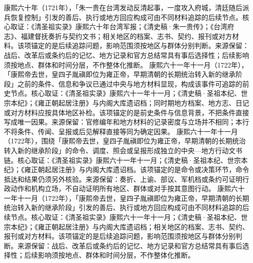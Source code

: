 康熙六十年（1721年），「朱一贵在台湾发动反清起事，一度攻入府城，清廷随后派兵恢复控制」引发的善后、执行或地方回应构成可由不同材料追踪的后续节点。核心取证：《清圣祖实录》康熙六十年台湾军报；《清史稿·朱一贵传》；《台湾府志》、福建督抚奏折与契约文书；相关地区的档案、志书、契约、报刊或对方材料。该项锚定的是后续追踪问题，影响范围须按地区与群体分别判断。来源保留：战后、改革后或条约后的记忆、地方记录和官方总结常具有事后选择性；后续影响须按地点、群体和时间分层，不作整体化推断。
康熙六十一年十一月（1722年），「康熙帝去世，皇四子胤禛即位为雍正帝，早期清朝的长期统治转入新的继承阶段」之前的条件、信息和争议已通过中央与地方材料显现，构成该事件可追踪的前史节点。核心取证：《清圣祖实录》康熙六十一年十一月；《清史稿·圣祖本纪、世宗本纪》；《雍正朝起居注册》与内阁大库遗诏档；同时期地方档案、地方志、日记或对方材料应按具体地区补检。该项锚定的是前史条件与信息背景，不把条件直接写成唯一因果。来源保留：官修编年和地方材料的记录密度与立场并不相同；本行不将条件、传闻、呈报或后见解释直接等同为确定因果。
康熙六十一年十一月（1722年），围绕「康熙帝去世，皇四子胤禛即位为雍正帝，早期清朝的长期统治转入新的继承阶段」的命令、调度、照会或呈报形成独立的中央—地方行动文书链。核心取证：《清圣祖实录》康熙六十一年十一月；《清史稿·圣祖本纪、世宗本纪》；《雍正朝起居注册》与内阁大库遗诏档。该项锚定的是命令或决策环节，命令抵达和结果仍须另外核验。来源保留：奏折、上谕、部议、军机档或条约可证明行政动作和机构立场，不自动证明所有地区、群体或对手按其意图行动。
康熙六十一年十一月（1722年），「康熙帝去世，皇四子胤禛即位为雍正帝，早期清朝的长期统治转入新的继承阶段」引发的善后、执行或地方回应构成可由不同材料追踪的后续节点。核心取证：《清圣祖实录》康熙六十一年十一月；《清史稿·圣祖本纪、世宗本纪》；《雍正朝起居注册》与内阁大库遗诏档；相关地区的档案、志书、契约、报刊或对方材料。该项锚定的是后续追踪问题，影响范围须按地区与群体分别判断。来源保留：战后、改革后或条约后的记忆、地方记录和官方总结常具有事后选择性；后续影响须按地点、群体和时间分层，不作整体化推断。
